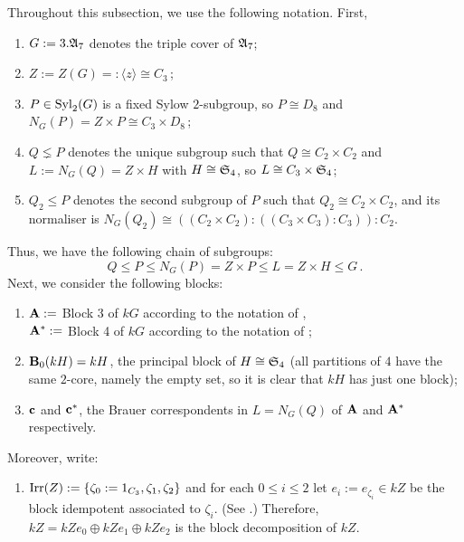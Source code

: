 \begin{nota}\label{nota:Section_3A7}%
Throughout this subsection, we use the following notation. First, 
\begin{enumerate}[label=(\arabic*)]
    \item $G:=3.{\mathfrak{A}}_7$ denotes the triple cover of ${\mathfrak{A}}_7$;
    \item $Z:=Z(G)=:\langle z\rangle\cong C_3$\,;
    \item  $P\in\operatorname{Syl}_2(G)$ is a fixed Sylow $2$-subgroup,  %
      so $P\cong D_8$ and $N_G(P)=Z\times P\cong C_3\times D_8$\,;
    \item  $Q\lneq P$ denotes the unique subgroup such that $Q\cong C_2\times C_2$ and $L:=N_G(Q)=Z\times H$ with $H\cong {\mathfrak{S}}_4$, so $L\cong C_3\times {\mathfrak{S}}_4$;  %
    \item $Q_2\leq P$ denotes the second subgroup of $P$ such that $Q_2\cong C_2\times C_2$, and its normaliser is $N_G(Q_2)\cong ((C_2\times C_2):( (C_3\times C_3):C_3 )):C_2$.
\end{enumerate}
Thus, we have the following chain of subgroups:
 $$Q\leq P\leq N_G(P)=Z\times P\leq L=Z\times H\leq G\,.$$
Next, we consider the following blocks: 
\begin{enumerate}[label=(\arabic*), start=6]
    \item ${\mathbf{A}}:=$ Block 3 of $kG$ according to the notation of \cite[A7mod2]{ModularAtlas},\\
    ${\mathbf{A}}^{\ast}:=$ Block 4 of $kG$ according to the notation of \cite[A7mod2]{ModularAtlas};   
    \item\label{nota:3A7_B0(kH)=kH}  ${\mathbf{B}}_0(kH)=kH$, the principal block of $H\cong {\mathfrak{S}}_4$ (all partitions of $4$ have the same $2$-core, namely the empty set, so it is clear that $kH$ has just one block);
    \item\label{nota:3A7_def_c_c3} ${\mathbf{c}}$ and ${\mathbf{c}}^\ast$,  the Brauer correspondents in $L=N_G(Q)$ of ${\mathbf{A}}$ and ${\mathbf{A}}^\ast$ respectively.
\end{enumerate}
Moreover,  write:
\begin{enumerate}[label=(\arabic*), start=9]
    \item\label{nota:blocksOfkZ}  $\operatorname{Irr}(Z):=\{\zeta_0:=1_{C_3},\zeta_1,\zeta_2\}$ and for each $0\leq i\leq 2$ let $e_i:=e_{\zeta_i}\in kZ$ be the block idempotent associated to $\zeta_i$. (See \cite[Chapter~3, Theorem~6.22]{NagaoTsushimaBook}.) Therefore, $kZ=kZe_0\oplus kZe_1\oplus kZe_2$ is the block decomposition of $kZ$. 

\end{enumerate}
\end{nota}
